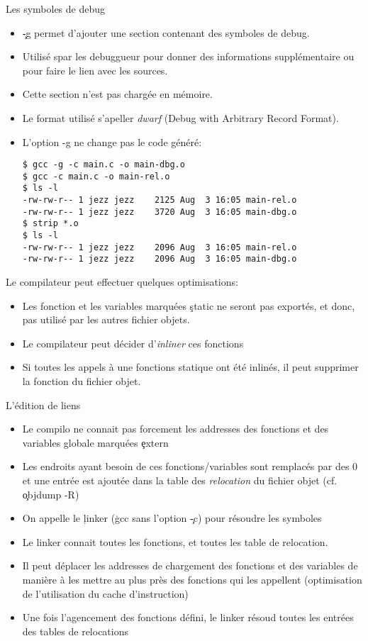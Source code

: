 \begin{frame}[fragile=singleslide]{Les symboles de debug}
  \begin{itemize}
  \item \c{-g} permet d'ajouter  une section contenant des symboles de
    debug.
  \item  Utilisé  spar les  debuggueur  pour  donner des  informations
    supplémentaire ou pour faire le lien avec les sources.
  \item Cette section n'est pas chargée en mémoire. 
  \item Le format utilisé s'apeller \emph{dwarf} (Debug with Arbitrary
    Record Format).
  \item L'option -g ne change pas le code généré:
    \begin{lstlisting}
$ gcc -g -c main.c -o main-dbg.o
$ gcc -c main.c -o main-rel.o
$ ls -l
-rw-rw-r-- 1 jezz jezz    2125 Aug  3 16:05 main-rel.o
-rw-rw-r-- 1 jezz jezz    3720 Aug  3 16:05 main-dbg.o
$ strip *.o
$ ls -l
-rw-rw-r-- 1 jezz jezz    2096 Aug  3 16:05 main-rel.o
-rw-rw-r-- 1 jezz jezz    2096 Aug  3 16:05 main-dbg.o
    \end{lstlisting} 
  \end{itemize}
  Le compilateur peut effectuer quelques optimisations:
  \begin{itemize}  
  \item Les  fonction et les  variables marquées \c{static}  ne seront
    pas exportés, et donc, pas utilisé par les autres fichier objets.
  \item  Le compilateur peut décider d'\emph{inliner} ces fonctions
  \item Si toutes les appels à une fonctions statique ont été inlinés,
    il peut supprimer la fonction du fichier objet.
  \end{itemize} 
\end{frame} 

\begin{frame}[fragile=singleslide]{L'édition de liens}
  \begin{itemize} 
  \item  Le compilo  ne connait  pas  forcement les  addresses des
    fonctions et des variables globale marquées \c{extern}
  \item  Les endroits  ayant  besoin de  ces fonctions/variables  sont
    remplacés par  des 0 et une  entrée est ajoutée dans  la table des
    \emph{relocation} du fichier objet (cf. \c{objdump -R})
  \item On  appelle le \c{linker} (\c{gcc} sans  l'option \c{-c}) pour
    résoudre les symboles
  \item Le linker connait toutes les fonctions, et toutes les table de
    relocation.
  \item Il peut déplacer les  addresses de chargement des fonctions et
    des variables de  manière à les mettre au  plus près des fonctions
    qui  les   appellent  (optimisation  de   l'utilisation  du  cache
    d'instruction)
  \item Une  fois l'agencement des fonctions défini,  le linker résoud
    toutes les entrées des tables de relocations
  \end{itemize}
\end{frame} 


